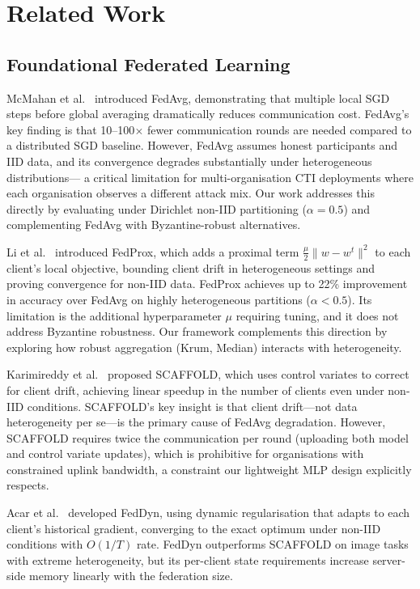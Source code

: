 \documentclass[conference]{IEEEtran}
\begin{document}
\section{Related Work}

\subsection{Foundational Federated Learning}

McMahan et al.~\cite{mcmahan2017} introduced FedAvg, demonstrating
that multiple local SGD steps before global averaging dramatically
reduces communication cost.
FedAvg's key finding is that 10--100$\times$ fewer communication
rounds are needed compared to a distributed SGD baseline.
However, FedAvg assumes honest participants and IID data, and its
convergence degrades substantially under heterogeneous distributions---
a critical limitation for multi-organisation CTI deployments where each
organisation observes a different attack mix.
Our work addresses this directly by evaluating under Dirichlet
non-IID partitioning ($\alpha=0.5$) and complementing FedAvg with
Byzantine-robust alternatives.

Li et al.~\cite{li2020fedprox} introduced FedProx, which adds a
proximal term $\frac{\mu}{2}\|w - w^t\|^2$ to each client's local
objective, bounding client drift in heterogeneous settings and proving
convergence for non-IID data.
FedProx achieves up to 22\% improvement in accuracy over FedAvg on
highly heterogeneous partitions ($\alpha < 0.5$).
Its limitation is the additional hyperparameter $\mu$ requiring tuning,
and it does not address Byzantine robustness.
Our framework complements this direction by exploring how robust
aggregation (Krum, Median) interacts with heterogeneity.

Karimireddy et al.~\cite{karimireddy2020scaffold} proposed SCAFFOLD,
which uses control variates to correct for client drift, achieving
linear speedup in the number of clients even under non-IID conditions.
SCAFFOLD's key insight is that client drift---not data heterogeneity
per se---is the primary cause of FedAvg degradation.
However, SCAFFOLD requires twice the communication per round (uploading
both model and control variate updates), which is prohibitive for
organisations with constrained uplink bandwidth, a constraint our
lightweight MLP design explicitly respects.

Acar et al.~\cite{acar2021feddyn} developed FedDyn, using dynamic
regularisation that adapts to each client's historical gradient,
converging to the exact optimum under non-IID conditions with $O(1/T)$
rate.
FedDyn outperforms SCAFFOLD on image tasks with extreme heterogeneity,
but its per-client state requirements increase server-side memory
linearly with the federation size.
\end{document}
